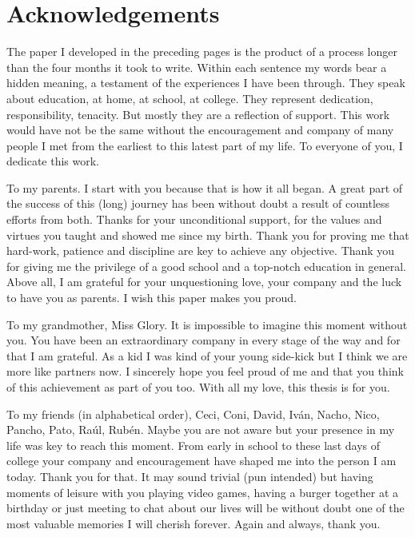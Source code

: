 \documentclass[english, a4paper, 12pt]{article}
\begin{document}

\newpage
\section*{Acknowledgements}
The paper I developed in the preceding pages is the product of a process longer than the four months it took to write. Within each sentence my words bear a hidden meaning, a testament of the experiences I have been through.  They speak about education, at home, at school, at college. They represent dedication, responsibility, tenacity. But mostly they are a reflection of support. This work would have not be the same without the encouragement and company of many people I met from the earliest to this latest part of my life. To everyone of you, I dedicate this work.

To my parents. I start with you because that is how it all began. A great part of the success of this (long) journey has been without doubt a result of countless efforts from both. Thanks for your unconditional support, for the values and virtues you taught and showed me since my birth. Thank you for proving me that hard-work, patience and discipline are key to achieve any objective. Thank you for giving me the privilege of a good school and a top-notch education in general. Above all, I am grateful for your unquestioning love, your company and the luck to have you as parents. I wish this paper makes you proud.

To my grandmother, Miss Glory. It is impossible to imagine this moment without you. You have been an extraordinary company in every stage of the way and for that I am grateful. As a kid I was kind of your young side-kick but I think we are more like partners now. I sincerely hope you feel proud of me and that you think of this achievement as part of you too. With all my love, this thesis is for you. 

To my friends (in alphabetical order), Ceci, Coni, David, Iván, Nacho, Nico, Pancho, Pato, Raúl, Rubén. Maybe you are not aware but your presence in my life was key to reach this moment. From early in school to these last days of college your company and encouragement have shaped me into the person I am today. Thank you for that. It may sound trivial (pun intended) but having moments of leisure with you playing video games, having a burger together at a birthday or just meeting to chat about our lives will be without doubt one of the most valuable memories I will cherish forever. Again and always, thank you.
\end{document}
